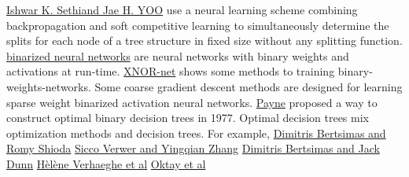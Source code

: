 \documentclass[UTF8]{article}
\begin{document}
\href{https://www.sciencedirect.com/science/article/abs/pii/S0031320397000058}{Ishwar K. Sethiand Jae H. YOO} use
a neural learning scheme combining backpropagation and soft competitive
learning to simultaneously determine the splits  for each node of a tree structure in fixed size
without any splitting function.
\href{http://simplecore-dev.intel.com/ai/wp-content/uploads/sites/71/1602.02830v3.pdf}{binarized neural networks}
are neural networks with binary weights and activations at run-time.
\href{https://www.xnor.ai/xnor-net}{XNOR-net}\cite{rastegari2016xnor-net:} shows some methods to training binary-weights-networks.
Some coarse gradient descent methods are designed for learning
sparse weight binarized activation neural networks\cite{yin2018blended}.
\href{https://ieeexplore.ieee.org/document/1674938}{Payne}\cite{opt}
proposed a way to construct optimal binary decision trees in 1977.
Optimal decision trees mix optimization methods and decision trees.
For example,
\href{https://ideas.repec.org/a/inm/oropre/v55y2007i2p252-271.html}{Dimitris Bertsimas and Romy Shioda}\cite{bertsimas2017optimal}
\href{https://link.springer.com/chapter/10.1007/978-3-319-59776-8_8}{Sicco Verwer and Yingqian Zhang}
\href{http://jack.dunn.nz/papers/OptimalClassificationTrees.pdf}{Dimitris Bertsimas and Jack Dunn}\cite{bertsimas2017optimal}
\href{http://genoweb.toulouse.inra.fr/~tschiex/CP2019/paper132post.pdf}{H\`{e}l\`{e}ne Verhaeghe et al}
\href{http://www.optimization-online.org/DB_FILE/2018/01/6404.pdf}{Oktay et al}
\end{document}

